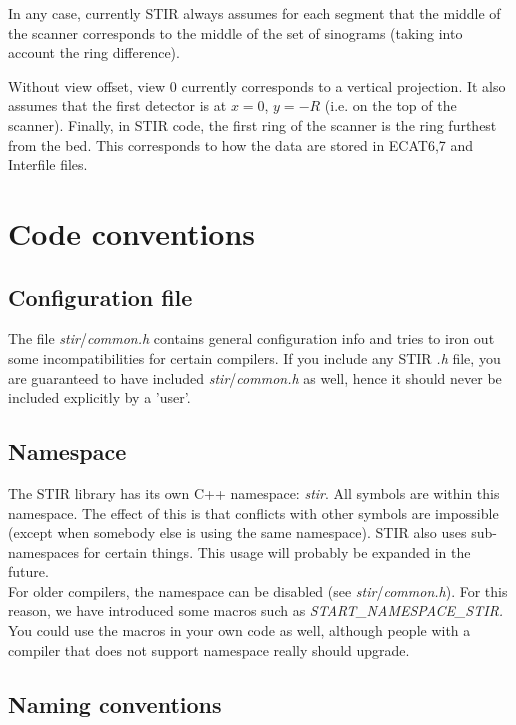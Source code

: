 \documentclass{article}
\begin{document}
In any case, currently STIR always assumes for each segment that 
the middle of the scanner corresponds to the middle of the set 
of sinograms (taking into account the ring difference). 

Without view offset, view 0 currently corresponds to a vertical projection.
It also assumes that the first detector is at $x=0$, $y=-R$ (i.e.
on the top of the scanner).
Finally, in STIR code, the first 
ring of the scanner is the ring furthest from the bed. This corresponds 
to how the data are stored in ECAT6,7 and Interfile files.

\section{
Code conventions}


\subsection{
Configuration file}

The file \textit{stir}/\textit{common.h} contains general configuration 
info and tries to iron out some incompatibilities for certain 
compilers. If you include any STIR \textit{.h} file, you are guaranteed 
to have included \textit{stir}/\textit{common.h} as well, hence it should 
never be included explicitly by a 'user'.

\subsection{
Namespace}

The STIR library has its own C++ namespace: \textit{stir}. All symbols 
are within this namespace. The effect of this is that conflicts 
with other symbols are impossible (except when somebody else 
is using the same namespace). STIR also uses sub-namespaces for 
certain things. This usage will probably be expanded in the future.\\
For older compilers, the namespace can be disabled (see \textit{stir}/\textit{common.h}). 
For this reason, we have introduced some macros such as \textit{START\_NAMESPACE\_STIR.} You 
could use the macros in your own code as well, although people 
with a compiler that does not support namespace really should 
upgrade.

\subsection{
Naming conventions }
\end{document}
